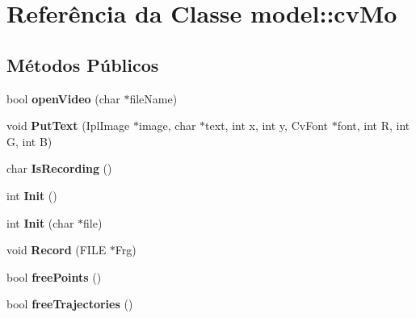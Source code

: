 \hypertarget{classmodel_1_1cvMo}{
\section{Referência da Classe model::cvMo}
\label{classmodel_1_1cvMo}
}
\subsection*{Métodos Públicos}
\begin{DoxyCompactItemize}
\item 
\hypertarget{classmodel_1_1cvMo_ad880bca0fa96bd7dc51e903771dc878d}{
bool {\bfseries openVideo} (char $\ast$fileName)}
\label{classmodel_1_1cvMo_ad880bca0fa96bd7dc51e903771dc878d}

\item 
\hypertarget{classmodel_1_1cvMo_a1a03ca3bdcac82eca5512c2fe6f72ecf}{
void {\bfseries PutText} (IplImage $\ast$image, char $\ast$text, int x, int y, CvFont $\ast$font, int R, int G, int B)}
\label{classmodel_1_1cvMo_a1a03ca3bdcac82eca5512c2fe6f72ecf}

\item 
\hypertarget{classmodel_1_1cvMo_a4cf4304e1953f7406ce4209dd7083aa5}{
char {\bfseries IsRecording} ()}
\label{classmodel_1_1cvMo_a4cf4304e1953f7406ce4209dd7083aa5}

\item 
\hypertarget{classmodel_1_1cvMo_a6c1a32a5a9375c3113be823fab038f26}{
int {\bfseries Init} ()}
\label{classmodel_1_1cvMo_a6c1a32a5a9375c3113be823fab038f26}

\item 
\hypertarget{classmodel_1_1cvMo_a0725375c5200165de455922900cab149}{
int {\bfseries Init} (char $\ast$file)}
\label{classmodel_1_1cvMo_a0725375c5200165de455922900cab149}

\item 
\hypertarget{classmodel_1_1cvMo_ab3e5215a42261c48f9cc9fc61a6d211c}{
void {\bfseries Record} (FILE $\ast$Frg)}
\label{classmodel_1_1cvMo_ab3e5215a42261c48f9cc9fc61a6d211c}

\item 
\hypertarget{classmodel_1_1cvMo_a870cb535fdfa0eb54c02cf9d3ed3dd3d}{
bool {\bfseries freePoints} ()}
\label{classmodel_1_1cvMo_a870cb535fdfa0eb54c02cf9d3ed3dd3d}

\item 
\hypertarget{classmodel_1_1cvMo_a6ecf231650b5224d623b3845a7a2b0b2}{
bool {\bfseries freeTrajectories} ()}
\label{classmodel_1_1cvMo_a6ecf231650b5224d623b3845a7a2b0b2}


\end{DoxyCompactItemize}

